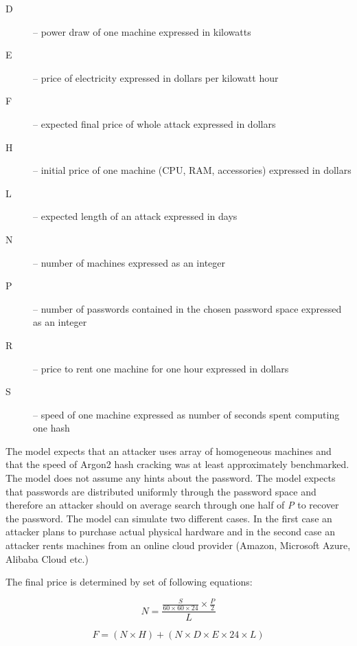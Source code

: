 \documentclass[nolof]{fithesis3}
\begin{document}
\begin{description}
\item[D] -- power draw of one machine expressed in kilowatts

\item[E] -- price of electricity expressed in dollars per kilowatt hour

\item[F] -- expected final price of whole attack expressed in dollars

\item[H] -- initial price of one machine (CPU, RAM, accessories) expressed in dollars

\item[L] -- expected length of an attack expressed in days

\item[N] -- number of machines expressed as an integer

\item[P] -- number of passwords contained in the chosen password space expressed as an integer

\item[R] -- price to rent one machine for one hour expressed in dollars

\item[S] -- speed of one machine expressed as number of seconds spent computing one hash
\end{description}

The model expects that an attacker uses array of homogeneous machines and that the speed of Argon2 hash cracking was at least approximately benchmarked. The model does not assume any hints about the password. The model expects that passwords are distributed uniformly through the password space and therefore an attacker should on average search through one half of \emph{P} to recover the password. The model can simulate two different cases. In the first case an attacker plans to purchase actual physical hardware and in the second case an attacker rents machines from an online cloud provider (Amazon, Microsoft Azure, Alibaba Cloud etc.)

The final price is determined by set of following equations:

\begin{equation}
\label{eq1}
N = \frac{\frac{S}{60 \times 60 \times 24} \times \frac{P}{2}}{L}
\end{equation}

\begin{equation}
\label{eq2}
F = ( N \times H ) + ( N \times D \times E \times 24 \times L)
\end{equation}
\end{document}

